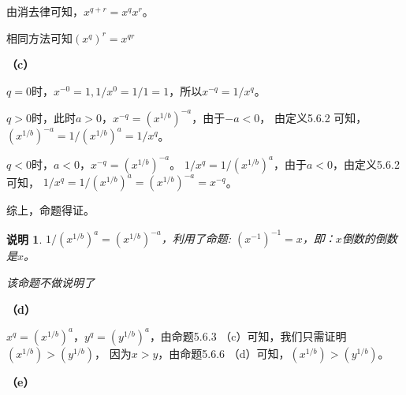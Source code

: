 \documentclass{article}
\theoremstyle{mystyle}
\newtheorem*{zremark}{说明}
\begin{document}
由消去律可知，$x^{q+r}=x^qx^r$。

相同方法可知$(x^q)^r = x^{qr}$

\textbf{（c）}

$q=0$时，$x^{-0}=1,1/x^0=1/1=1$，所以$x^{-q}=1/x^q$。

$q > 0$时，此时$a>0$，$x^{-q} = (x^{1/b})^{-a}$，由于$-a < 0$，
由定义5.6.2 可知，$(x^{1/b})^{-a} = 1/(x^{1/b})^{a} = 1/x^q$。

$q < 0$时，$a < 0$，$x^{-q} = (x^{1/b})^{-a}$。
$1/x^q = 1/(x^{1/b})^a$，由于$a<0$，由定义5.6.2 可知，
$1/x^q = 1/(x^{1/b})^a=(x^{1/b})^{-a}=x^{-q}$。

综上，命题得证。

\begin{zgraytheorem}
  \begin{zremark}
    $1/(x^{1/b})^a=(x^{1/b})^{-a}$，利用了命题: $(x^{-1})^{-1}=x$，即：$x$倒数的倒数是$x$。

    该命题不做说明了
  \end{zremark}
\end{zgraytheorem}

\textbf{（d）}

$x^q = (x^{1/b})^a$，$y^q=(y^{1/b})^a$，由命题5.6.3 （c）可知，我们只需证明$(x^{1/b})>(y^{1/b})$，
因为$x>y$，由命题5.6.6 （d）可知，$(x^{1/b})>(y^{1/b})$。

\textbf{（e）}
\end{document}
